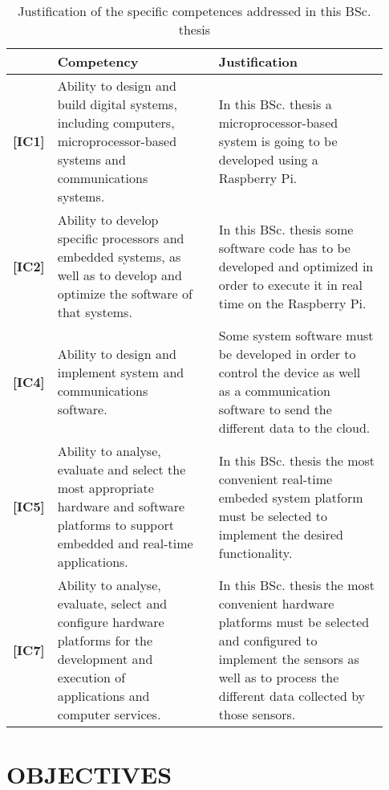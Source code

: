 \documentclass{pre-tfg}
\begin{document}
\begin{table}[hp]
  \centering
  \caption{Justification of the specific competences addressed in this BSc. thesis}
  \label{tab:competencias}

  \begin{tabular}{m{0.06\linewidth}m{0.4\linewidth}m{0.01\linewidth}m{0.46\linewidth}}
    &\textbf{Competency} && \textbf{Justification} \\
    \hline

    \textbf{[IC1]}& Ability to design and build digital systems, including computers, microprocessor-based systems and communications systems.&& In this BSc. thesis a microprocessor-based system is going to be developed using a Raspberry Pi. \\
    
    \textbf{[IC2]}& Ability to develop specific processors and embedded systems, as well as to develop and optimize the software of that systems.&& In this BSc. thesis some software code has to be developed and optimized in order to execute it in real time on the Raspberry Pi. \\
    
    \textbf{[IC4]}& Ability to design and implement system and communications software.&& Some system software must be developed in order to control the device as well as a communication software to send the different data to the cloud. \\
    
    \textbf{[IC5]}& Ability to analyse, evaluate and select the most appropriate hardware and software platforms to support embedded and real-time applications.&& In this BSc. thesis the most convenient real-time embeded system platform must be selected to implement the desired functionality. \\
    
    \textbf{[IC7]}& Ability to analyse, evaluate, select and configure hardware platforms for the development and execution of applications and computer services.&& In this BSc. thesis the most convenient hardware platforms must be selected and configured to implement the sensors as well as to process the different data collected by those sensors. \\
    
    \hline
  \end{tabular}
\end{table}


\section{OBJECTIVES}
\end{document}
